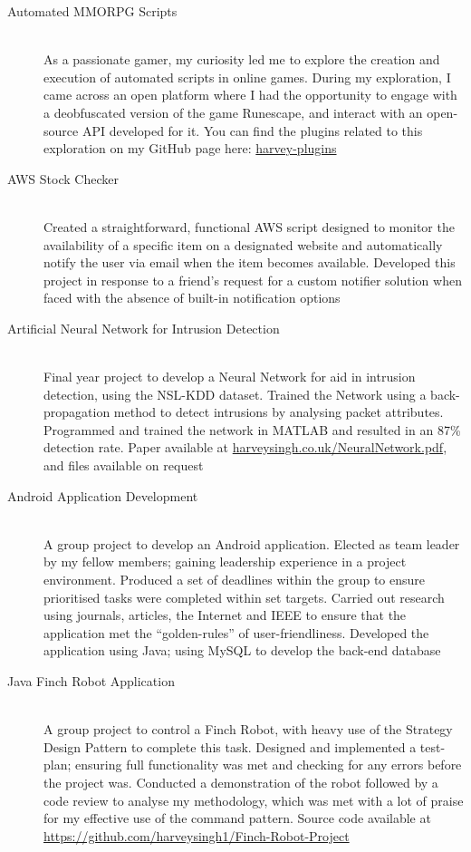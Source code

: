 \documentclass[a4paper,10pt]{extarticle} %
\begin{document}
{\begin{description}
\item[Automated MMORPG Scripts]\hfill \\
As a passionate gamer, my curiosity led me to explore the creation and execution of automated scripts in online games. During my exploration, I came across an open platform where I had the opportunity to engage with a deobfuscated version of the game Runescape, and interact with an open-source API developed for it. You can find the plugins related to this exploration on my GitHub page here: \href{https://github.com/harveylx/harvey-plugins}{harvey-plugins}

\item[AWS Stock Checker]\hfill \\
Created a straightforward, functional AWS script designed to monitor the availability of a specific item on a designated website and automatically notify the user via email when the item becomes available. Developed this project in response to a friend's request for a custom notifier solution when faced with the absence of built-in notification options

\item[Artificial Neural Network for Intrusion Detection]\hfill \\
Final year project to develop a Neural Network for aid in intrusion detection, using the NSL-KDD dataset. Trained the Network using a back-propagation method to detect intrusions by analysing packet attributes. Programmed and trained the network in MATLAB and resulted in an 87\% detection rate. Paper available at \href{http://harveysingh.co.uk/NeuralNetwork.pdf}{harveysingh.co.uk/NeuralNetwork.pdf}, and files available on request

\item[Android Application Development]\hfill \\
A group project to develop an Android application. Elected as team leader by my fellow members; gaining leadership experience in a project environment. Produced a set of deadlines within the group to ensure prioritised tasks were completed within set targets. Carried out research using journals, articles, the Internet and IEEE to ensure that the application met the “golden-rules” of user-friendliness. Developed the application using Java; using MySQL to develop the back-end database

\item[Java Finch Robot Application]\hfill \\
A group project to control a Finch Robot, with heavy use of the Strategy Design Pattern to complete this task. Designed and implemented a test-plan; ensuring full functionality was met and checking for any errors before the project was. Conducted a demonstration of the robot followed by a code review to analyse my methodology, which was met with a lot of praise for my effective use of the command pattern. Source code available at \href{https://github.com/harveysingh1/Finch-Robot-Project}{https://github.com/harveysingh1/Finch-Robot-Project}


\end{description}}
\end{document}
